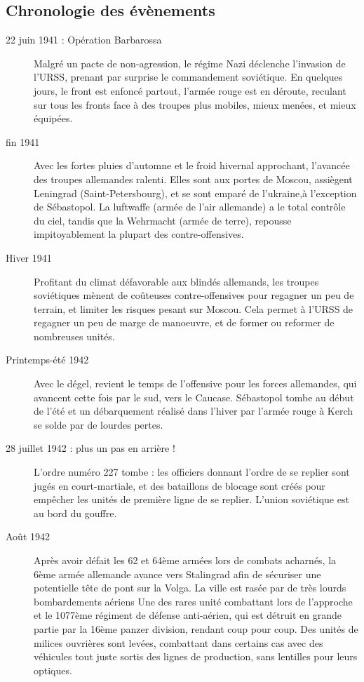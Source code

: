 \documentclass{report}
\begin{document}
\begin{multicols}{2}
\subsection{Chronologie des évènements}
\begin{description}
\item[22 juin 1941 : Opération Barbarossa] Malgré un pacte de non-agression, le régime Nazi déclenche l'invasion de l'URSS, prenant par surprise le commandement soviétique. En quelques jours, le front est enfoncé partout, l'armée rouge est en déroute, reculant sur tous les fronts face à des troupes plus mobiles, mieux menées, et mieux équipées. 
\item[fin 1941] Avec les fortes pluies d'automne et le froid hivernal approchant, l'avancée des troupes allemandes ralenti. Elles sont aux portes de Moscou, assiègent Leningrad (Saint-Petersbourg), et se sont emparé de l'ukraine,à l'exception de Sébastopol. La luftwaffe (armée de l'air allemande) a le total contrôle du ciel, tandis que la Wehrmacht (armée de terre), repousse impitoyablement la plupart des contre-offensives.
\item[Hiver 1941] Profitant du climat défavorable aux blindés allemands, les troupes soviétiques mènent de coûteuses contre-offensives pour regagner un peu de terrain, et limiter les risques pesant sur Moscou. Cela permet à l'URSS de regagner un peu de marge de manoeuvre, et de former ou reformer de nombreuses unités.
\item[Printemps-été 1942] Avec le dégel, revient le temps de l'offensive pour les forces allemandes, qui avancent cette fois par le sud, vers le Caucase. Sébastopol tombe au début de l'été et un débarquement réalisé dans l'hiver par l'armée rouge à Kerch se solde par de lourdes pertes.
\item[28 juillet 1942 : plus un pas en arrière !] L'ordre numéro 227 tombe : les officiers donnant l'ordre de se replier sont jugés en court-martiale, et des bataillons de blocage sont créés pour empêcher les unités de première ligne de se replier. L'union soviétique est au bord du gouffre.
\item[Août 1942]Après avoir défait les 62 et 64ème armées lors de combats acharnés, la 6ème armée allemande avance vers Stalingrad afin de sécuriser une potentielle tête de pont sur la Volga. La ville est rasée par de très lourds bombardements aériens Une des rares unité combattant lors de l'approche et le 1077ème régiment de défense anti-aérien, qui est détruit en grande partie par la 16ème panzer division, rendant coup pour coup. Des unités de milices ouvrières sont levées, combattant dans certains cas avec des véhicules tout juste sortis des lignes de production, sans lentilles pour leurs optiques.

\end{description}
\end{multicols}
\end{document}

